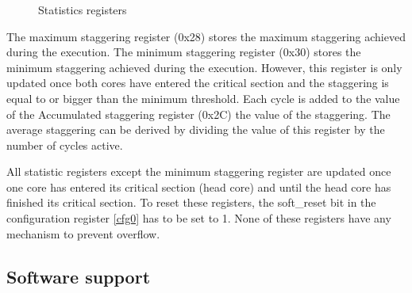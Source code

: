 \begin{figure}[H]
	\begin{center}
		 \\
		 \\
		 \\
		 \\
		 \\
		 \\
		 \\
		 \\
		 \\
		 \\
		\end{center}
	\caption{Statistics registers}\label{fig:reg_statistics}
\end{figure}

The maximum staggering register (0x28) stores the maximum staggering achieved during the execution. The minimum staggering register (0x30) stores the minimum staggering achieved during the execution. However, this register is only updated once both cores have entered the critical section and the staggering is equal to or bigger than the minimum threshold. Each cycle is added to the value of the Accumulated staggering register (0x2C) the value of the staggering. The average staggering can be derived by dividing the value of this register by the number of cycles active.

All statistic registers except the minimum staggering register are updated once one core has entered its critical section (head core) and until the head core has finished its critical section. To reset these registers, the soft\_reset bit in the configuration register \ref{cfg0} has to be set to 1. None of these registers have any mechanism to prevent overflow.

\hspace{1cm}



\subsection{Software support}

